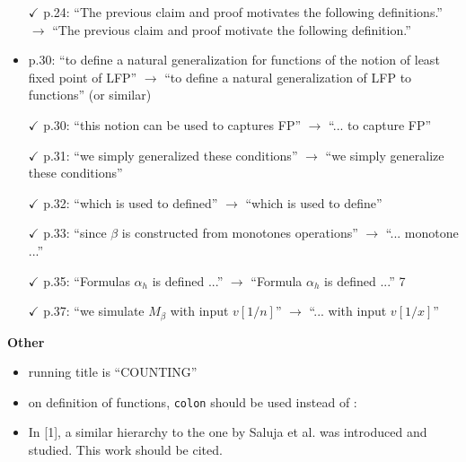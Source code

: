 \begin{itemize}
	\item[$\checkmark$] p.24: ``The previous claim and proof motivates the following definitions.'' $\to$ ``The previous
	claim and proof motivate the following definition.''
	\item p.30: ``to define a natural generalization for functions of the notion of least fixed point of
	LFP'' $\to$ ``to define a natural generalization of LFP to functions'' (or similar)
	\item[$\checkmark$] p.30: ``this notion can be used to captures FP'' $\to$ ``... to capture FP''
	\item[$\checkmark$] p.31: ``we simply generalized these conditions'' $\to$ ``we simply generalize these conditions''
	\item[$\checkmark$] p.32: ``which is used to defined'' $\to$ ``which is used to define''
	\item[$\checkmark$] p.33: ``since $\beta$ is constructed from monotones operations'' $\to$ ``... monotone ...''
	\item[$\checkmark$] p.35: ``Formulas $\alpha_h$ is defined ...'' $\to$ ``Formula $\alpha_h$ is defined ...''
	7
	\item[$\checkmark$] p.37: ``we simulate $M_\beta$ with input $v[1/n]$'' $\to$ ``... with input $v[1/x]$''
\end{itemize}
\vspace{1em}
{\bf Other}
\begin{itemize}
	\setlength\itemsep{0.5em}
	\item running title is ``COUNTING''
	\item on definition of functions, \texttt{colon} should be used instead of :
	\item In [1], a similar hierarchy to the one by Saluja et al. was introduced and studied. This work
	should be cited.
\end{itemize}